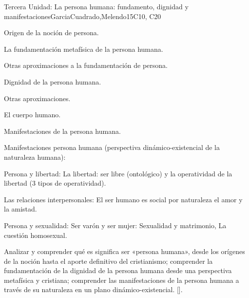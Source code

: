 \begin{syllabus}
\begin{unit}{}{Tercera Unidad: La persona humana: fundamento, dignidad y manifestaciones}{GarciaCuadrado,Melendo}{15}{C10, C20}
\begin{topics}
	\item Origen de la noción de persona.
	\item La fundamentación metafísica de la persona humana.
	\item Otras aproximaciones a la fundamentación de persona.
	\item Dignidad de la persona humana.
		\begin{subtopics}
			\item Otras aproximaciones.
		\end{subtopics}
	\item El cuerpo humano.
	\item Manifestaciones de la persona humana.
	\item Manifestaciones persona humana (perspectiva dinámico-existencial de la naturaleza humana):
		\begin{subtopics}
			\item Persona y libertad:  La libertad: ser libre (ontológico) y la operatividad de la libertad (3 tipos de operatividad).
			\item Las relaciones interpersonales: El ser humano es social por naturaleza el amor y la amistad.
			\item Persona y sexualidad: Ser varón y ser mujer: Sexualidad y matrimonio, La cuestión homosexual.
		\end{subtopics}
\end{topics}
\begin{learningoutcomes}
	\item Analizar y comprender qué es significa ser «persona humana», desde los orígenes de la noción hasta el aporte definitivo del cristianismo; comprender la fundamentación de la dignidad de la persona humana desde una perspectiva metafísica y cristiana; comprender las manifestaciones de la persona humana a través de su naturaleza en un plano dinámico-existencial. [\Usage].
\end{learningoutcomes}
\end{unit}


\end{syllabus}
